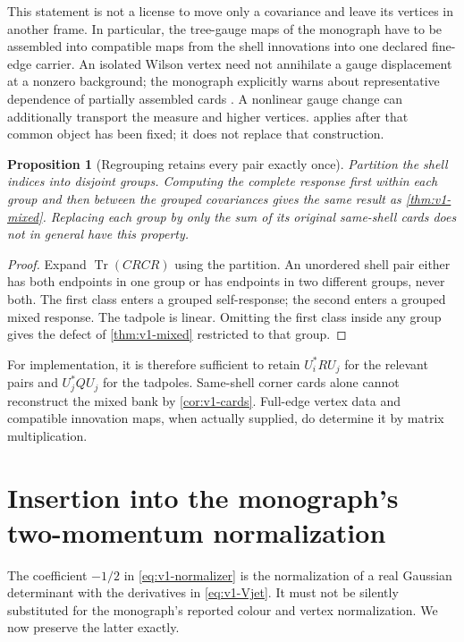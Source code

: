 \documentclass[11pt,a4paper]{article}
\newtheorem{proposition}[proposition]{Proposition}
\theoremstyle{definition}
\theoremstyle{remark}
\DeclareMathOperator{\Tr}{Tr}
\newcommand{\src}[2]{\cite[#2]{#1}}
\begin{document}
This statement is not a license to move only a covariance and leave its
vertices in another frame. In particular, the tree-gauge maps of the
monograph have to be assembled into compatible maps from the shell
innovations into one declared fine-edge carrier. An isolated Wilson
vertex need not annihilate a gauge displacement at a nonzero background;
the monograph explicitly warns about representative dependence of
partially assembled cards \src{YM3}{\texttt{prop:representative-dependence}}.
A nonlinear gauge change can additionally transport the measure and
higher vertices.  applies after that common object has
been fixed; it does not replace that construction.

\begin{proposition}[Regrouping retains every pair exactly once]
\label{prop:v1-regroup}
Partition the shell indices into disjoint groups. Computing the complete
response first within each group and then between the grouped
covariances gives the same result as \cref{thm:v1-mixed}. Replacing each
group by only the sum of its original same-shell cards does not in
general have this property.
\end{proposition}
\begin{proof}
Expand $\Tr(CRCR)$ using the partition. An unordered shell pair either
has both endpoints in one group or has endpoints in two different
groups, never both. The first class enters a grouped self-response; the
second enters a grouped mixed response. The tadpole is linear. Omitting
the first class inside any group gives the defect of
\cref{thm:v1-mixed} restricted to that group.
\end{proof}

For implementation, it is therefore sufficient to retain $U_i^*RU_j$
for the relevant pairs and $U_j^*QU_j$ for the tadpoles. Same-shell
corner cards alone cannot reconstruct the mixed bank by
\cref{cor:v1-cards}. Full-edge vertex data and compatible innovation maps,
when actually supplied, do determine it by matrix multiplication.

\section{Insertion into the monograph's two-momentum normalization}
\label{sec:v1-Wilson}

The coefficient $-1/2$ in \cref{eq:v1-normalizer} is the normalization of
a real Gaussian determinant with the derivatives in
\cref{eq:v1-Vjet}. It must not be silently substituted for the monograph's
reported colour and vertex normalization. We now preserve the latter
exactly.
\end{document}

